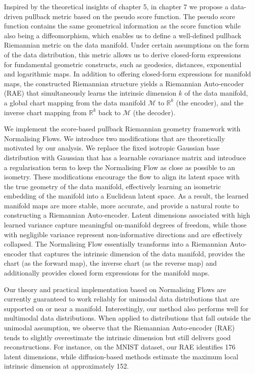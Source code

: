 Inspired by the theoretical insights of chapter 5, in chapter 7 we propose a data-driven pullback metric based on the pseudo score function. The pseudo score function contains the same geometrical information as the score function while also being a diffeomorphism, which enables us to define a well-defined pullback Riemannian metric on the data manifold. Under certain assumptions on the form of the data distribution, this metric allows us to derive closed-form expressions for fundamental geometric constructs, such as geodesics, distances, exponential and logarithmic maps. In addition to offering closed-form expressions for manifold maps, the constructed Riemannian structure yields a Riemannian Auto-encoder (RAE) that simultaneously learns the intrinsic dimension \( k \) of the data manifold, a global chart mapping from the data manifold \(\mathcal{M}\) to \(\mathbb{R}^k\) (the encoder), and the inverse chart mapping from \(\mathbb{R}^k\) back to \(\mathcal{M}\) (the decoder).

We implement the score-based pullback Riemannian geometry framework with Normalising Flows. We introduce two modifications that are theoretically motivated by our analysis. We replace the fixed isotropic Gaussian base distribution with Gaussian that has a learnable covariance matrix and introduce a regularisation term to keep the Normalising Flow as close as possible to an isometry. These modifications encourage the flow to align its latent space with the true geometry of the data manifold, effectively learning an isometric embedding of the manifold into a Euclidean latent space. As a result, the learned manifold maps are more stable, more accurate, and provide a natural route to constructing a Riemannian Auto-encoder. Latent dimensions associated with high learned variance capture meaningful on-manifold degrees of freedom, while those with negligible variance represent non-informative directions and are effectively collapsed. The Normalising Flow essentially transforms into a Riemannian Auto-encoder that captures the intrinsic dimension of the data manifold, provides the chart (as the forward map), the inverse chart (as the reverse map) and additionally provides closed form expressions for the manifold maps. 


Our theory and practical implementation based on Normalising Flows are currently guaranteed to work reliably for unimodal data distributions that are supported on or near a manifold. Interestingly, our method also performs well for multimodal data distributions. When applied to distributions that fall outside the unimodal assumption, we observe that the Riemannian Auto-encoder (RAE) tends to slightly overestimate the intrinsic dimension but still delivers good reconstructions. For instance, on the MNIST dataset, our RAE identifies 176 latent dimensions, while diffusion-based methods estimate the maximum local intrinsic dimension at approximately 152.

